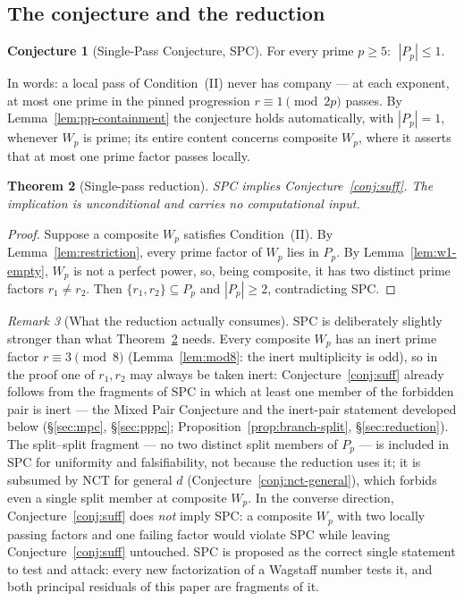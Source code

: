 \documentclass[11pt]{amsart}
\theoremstyle{plain}
\newtheorem{theorem}{Theorem}[section]
\theoremstyle{definition}
\newtheorem{conjecture}[theorem]{Conjecture}
\theoremstyle{remark}
\newtheorem{remark}[theorem]{Remark}
\numberwithin{equation}{section}
\begin{document}
\subsection{The conjecture and the reduction}

\begin{conjecture}[Single-Pass Conjecture, SPC]\label{conj:spc}
For every prime $p \geq 5$: $\;|P_p| \leq 1$.
\end{conjecture}

In words: a local pass of Condition~(II) never has company --- at each
exponent, at most one prime in the pinned progression
$r \equiv 1 \pmod{2p}$ passes. By Lemma~\ref{lem:pp-containment} the
conjecture holds automatically, with $|P_p| = 1$, whenever $W_p$ is
prime; its entire content concerns composite $W_p$, where it asserts
that at most one prime factor passes locally.

\begin{theorem}[Single-pass reduction]\label{thm:spc-reduction}
SPC implies Conjecture~\ref{conj:suff}. The implication is unconditional
and carries no computational input.
\end{theorem}

\begin{proof}
Suppose a composite $W_p$ satisfies Condition~(II). By
Lemma~\ref{lem:restriction}, every prime factor of $W_p$ lies in $P_p$.
By Lemma~\ref{lem:w1-empty}, $W_p$ is not a perfect power, so, being
composite, it has two distinct prime factors $r_1 \neq r_2$. Then
$\{r_1, r_2\} \subseteq P_p$ and $|P_p| \geq 2$, contradicting SPC.
\end{proof}

\begin{remark}[What the reduction actually consumes]\label{rem:spc-strict}
SPC is deliberately slightly stronger than what
Theorem~\ref{thm:spc-reduction} needs. Every composite $W_p$ has an
inert prime factor $r \equiv 3 \pmod 8$ (Lemma~\ref{lem:mod8}: the inert
multiplicity is odd), so in the proof one of $r_1, r_2$ may always be
taken inert: Conjecture~\ref{conj:suff} already follows from the
fragments of SPC in which at least one member of the forbidden pair is
inert --- the Mixed Pair Conjecture and the inert-pair statement
developed below (\S\ref{sec:mpc}, \S\ref{sec:pppc};
Proposition~\ref{prop:branch-split}, \S\ref{sec:reduction}).
The split--split fragment ---
no two distinct split members of $P_p$ --- is included in SPC for
uniformity and falsifiability, not because the reduction uses it; it is
subsumed by NCT for general $d$ (Conjecture~\ref{conj:nct-general}),
which forbids even a single split member at composite $W_p$. In the
converse direction, Conjecture~\ref{conj:suff} does \emph{not} imply
SPC: a composite $W_p$ with two locally passing factors and one failing
factor would violate SPC while leaving Conjecture~\ref{conj:suff}
untouched. SPC is proposed as the correct single statement to test and
attack: every new factorization of a Wagstaff number tests it, and both
principal residuals of this paper are fragments of it.
\end{remark}
\end{document}
